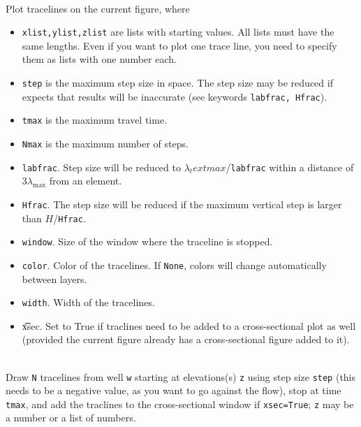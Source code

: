 \documentclass [10pt,letterpaper] {article}
\begin{document}
\vskip0.5cm
\\Plot tracelines on the current figure, where
\begin{itemize}
\item {\tt xlist,ylist,zlist} are lists with starting values. All lists must have the same lengths. Even if you want to plot one trace line, you need to specify them as lists with one number each.
\item {\tt step} is the maximum step size in space. The step size may be reduced if \Timsp expects that results will be inaccurate (see keywords {\tt labfrac, Hfrac}).
\item {\tt tmax} is the maximum travel time.
\item {\tt Nmax} is the maximum number of steps.
\item {\tt labfrac}. Step size will be reduced to $\lambda_text{max}$/{\tt labfrac} within a distance of $3\lambda_\text{max}$ from an element.
\item {\tt Hfrac}. The step size will be reduced if the maximum vertical step is larger than $H$/{\tt Hfrac}.
\item {\tt window}. Size of the window where the traceline is stopped.
\item {\tt color}. Color of the tracelines. If {\tt None}, colors will change automatically between layers.
\item {\tt width}. Width of the tracelines.
\item {\t xsec}. Set to True if traclines need to be added to a cross-sectional plot as well (provided the current figure already has a cross-sectional figure added to it).
\end{itemize}

\vskip0.5cm
\\Draw {\tt N} tracelines from well {\tt w} starting at elevations(s) {\tt z} using step size {\tt step} (this needs to be a negative value, as you want to go against the flow), stop at time {\tt tmax}, and add the traclines to the cross-sectional window if {\tt xsec=True}; {\tt z} may be a number or a list of numbers.
\end{document}
